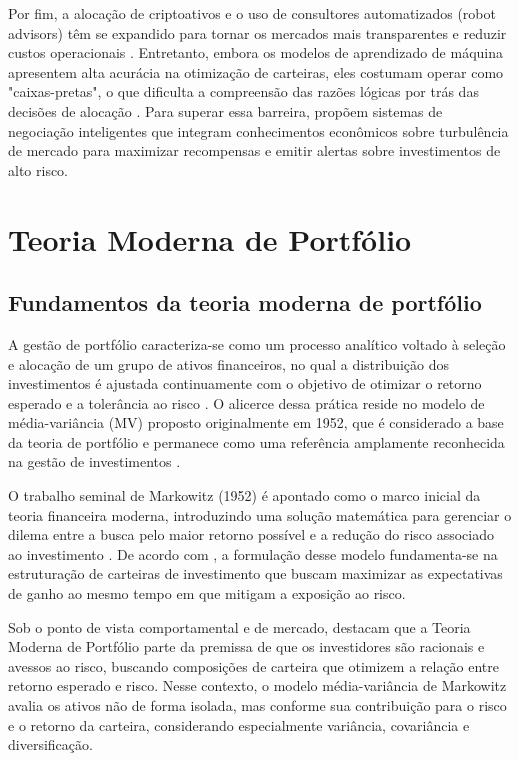 Por fim, a alocação de criptoativos e o uso de consultores automatizados (robot advisors) têm se expandido para tornar os mercados mais transparentes e reduzir custos operacionais \cite{babaei2022explainable}. Entretanto, embora os modelos de aprendizado de máquina apresentem alta acurácia na otimização de carteiras, eles costumam operar como "caixas-pretas", o que dificulta a compreensão das razões lógicas por trás das decisões de alocação \cite{babaei2022explainable}. Para superar essa barreira,  propõem sistemas de negociação inteligentes que integram conhecimentos econômicos sobre turbulência de mercado para maximizar recompensas e emitir alertas sobre investimentos de alto risco.

\section{Teoria Moderna de Portfólio}
\label{sec_teoria_moderna_de_portfolio}

\subsection{Fundamentos da teoria moderna de portfólio}
\label{subsec_fundamentos_da_teoria_moderna_de_portfolio}

A gestão de portfólio caracteriza-se como um processo analítico voltado à seleção e alocação de um grupo de ativos financeiros, no qual a distribuição dos investimentos é ajustada continuamente com o objetivo de otimizar o retorno esperado e a tolerância ao risco \cite{chaweewanchon2022markowitz}. O alicerce dessa prática reside no modelo de média-variância (MV) proposto originalmente em 1952, que é considerado a base da teoria de portfólio e permanece como uma referência amplamente reconhecida na gestão de investimentos \cite{chaweewanchon2022markowitz}.

O trabalho seminal de Markowitz (1952) é apontado como o marco inicial da teoria financeira moderna, introduzindo uma solução matemática para gerenciar o dilema entre a busca pelo maior retorno possível e a redução do risco associado ao investimento \cite{paiva2019decision}. De acordo com , a formulação desse modelo fundamenta-se na estruturação de carteiras de investimento que buscam maximizar as expectativas de ganho ao mesmo tempo em que mitigam a exposição ao risco.

Sob o ponto de vista comportamental e de mercado,  destacam que a Teoria Moderna de Portfólio parte da premissa de que os investidores são racionais e avessos ao risco, buscando composições de carteira que otimizem a relação entre retorno esperado e risco. Nesse contexto, o modelo média-variância de Markowitz avalia os ativos não de forma isolada, mas conforme sua contribuição para o risco e o retorno da carteira, considerando especialmente variância, covariância e diversificação.

